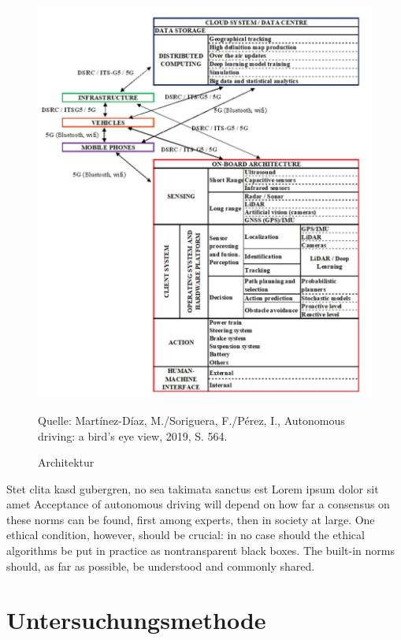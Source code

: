 \begin{figure}
	\caption[Architektur]{Architektur}
	\centering
	\includegraphics[]{assets/figures/Architektur.jpg}
	\begin{flushleft}
		Quelle: Martínez-Díaz, M./Soriguera, F./Pérez, I., Autonomous driving: a bird's eye view, 2019, S. 564.
	\end{flushleft}
\end{figure}

Stet clita kasd gubergren, no sea takimata sanctus est Lorem ipsum dolor sit amet Acceptance of autonomous driving will depend on how far a consensus on these norms can be found, first among experts, then in society at large.
One ethical condition, however, should be crucial: in no case should the ethical algorithms be put in practice as nontransparent black boxes.
The built-in norms should, as far as possible, be understood and commonly shared.

\section{Untersuchungsmethode}

